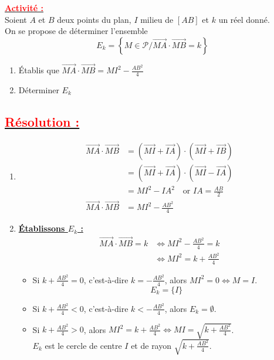 \documentclass[12pt,a4paper]{article}
\newcounter{solution}
\begin{document}
\textbf{\underline{\textcolor{red}{Activité :}}} \\
Soient $A$ et $B$ deux points du plan, $I$ milieu de $[AB]$ et $k$ un réel donné. \\
On se propose de déterminer l'ensemble
\[
E_k = \left\{ M \in \mathcal{P} \big/ \overrightarrow{MA} \cdot \overrightarrow{MB} = k \right\}
\]

\begin{enumerate}
    \item Établis que $\overrightarrow{MA} \cdot \overrightarrow{MB} = MI^2 - \frac{AB^2}{4}$
    \item Déterminer $E_k$
\end{enumerate}

\subsection*{\underline{\textbf{\textcolor{red}{Résolution :}}}}

\begin{enumerate}
    \item 
    \begin{align*}
    \overrightarrow{MA} \cdot \overrightarrow{MB} &= (\overrightarrow{MI} + \overrightarrow{IA}) \cdot (\overrightarrow{MI} + \overrightarrow{IB}) \\
    &= (\overrightarrow{MI} + \overrightarrow{IA}) \cdot (\overrightarrow{MI} - \overrightarrow{IA}) \\
    &= MI^2 - IA^2 \quad \text{or } IA = \frac{AB}{2} \\
    \overrightarrow{MA} \cdot \overrightarrow{MB} &= MI^2 - \frac{AB^2}{4}
    \end{align*}

    \item \textbf{\underline{Établissons $E_k$ :}}
    \begin{align*}
    \overrightarrow{MA} \cdot \overrightarrow{MB} = k &\iff MI^2 - \frac{AB^2}{4} = k \\
    &\iff MI^2 = k + \frac{AB^2}{4}
    \end{align*}

    \begin{itemize}
        \item Si $k + \frac{AB^2}{4} = 0$, c'est-à-dire $k = -\frac{AB^2}{4}$, alors $MI^2 = 0 \iff M = I$.
        \[
        E_k = \{I\}
        \]

        \item Si $k + \frac{AB^2}{4} < 0$, c'est-à-dire $k < -\frac{AB^2}{4}$, alors $E_k = \emptyset$.

        \item Si $k + \frac{AB^2}{4} > 0$, alors $MI^2 = k + \frac{AB^2}{4} \iff MI = \sqrt{k + \frac{AB^2}{4}}$. \\
        $E_k$ est le cercle de centre $I$ et de rayon $\sqrt{k + \frac{AB^2}{4}}$.
    \end{itemize}
\end{enumerate}
\end{document}
